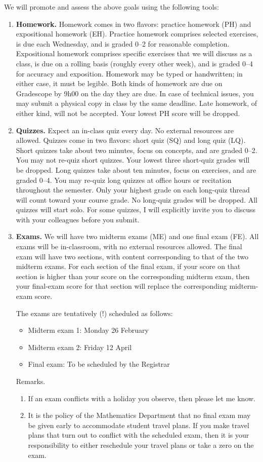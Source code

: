 We will promote and assess the above goals using the following tools:
\begin{enumerate}
	\item \textbf{Homework.} Homework comes in two flavors: practice homework (PH) and expositional homework (EH). Practice homework comprises selected exercises, is due each Wednesday, and is graded 0--2 for reasonable completion. Expositional homework comprises specific exercises that we will discuss as a class, is due on a rolling basis (roughly every other week), and is graded 0--4 for accuracy and exposition. Homework may be typed or handwritten; in either case, it must be legible. Both kinds of homework are due on Gradescope by 9h00 on the day they are due. In case of technical issues, you may submit a physical copy in class by the same deadline. Late homework, of either kind, will not be accepted. Your lowest PH score will be dropped.
	\item \textbf{Quizzes.} Expect an in-class quiz every day. No external resources are allowed. Quizzes come in two flavors: short quiz (SQ) and long quiz (LQ). Short quizzes take about two minutes, focus on concepts, and are graded 0--2. You may not re-quiz short quizzes. Your lowest three short-quiz grades will be dropped. Long quizzes take about ten minutes, focus on exercises, and are graded 0--4. You may re-quiz long quizzes at office hours or recitation throughout the semester. Only your highest grade on each long-quiz thread will count toward your course grade. No long-quiz grades will be dropped. All quizzes will start solo. For some quizzes, I will explicitly invite you to discuss with your colleagues before you submit.
	\item \textbf{Exams.} We will have two midterm exams (ME) and one final exam (FE). All exams will be in-classroom, with no external resources allowed. The final exam will have two sections, with content corresponding to that of the two midterm exams. For each section of the final exam, if your score on that section is higher than your score on the corresponding midterm exam, then your final-exam score for that section will replace the corresponding midterm-exam score.
	
	The exams are tentatively (!) scheduled as follows:
	\begin{itemize}
	    \item Midterm exam 1: Monday 26 February
	    \item Midterm exam 2: Friday 12 April
	    \item Final exam: To be scheduled by the Registrar
	\end{itemize}
	Remarks.
	\begin{enumerate}
	    \item If an exam conflicts with a holiday you observe, then please let me know.
	    \item It is the policy of the Mathematics Department that no final exam may be given early to accommodate student travel plans. If you make travel plans that turn out to conflict with the scheduled exam, then it is your responsibility to either reschedule your travel plans or take a zero on the exam.
	\end{enumerate}
\end{enumerate}


